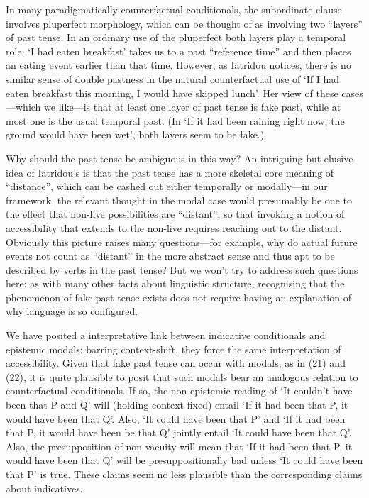 In many paradigmatically counterfactual conditionals, the subordinate
clause involves pluperfect morphology, which can be thought of as
involving two ``layers'' of past tense. In an ordinary use of the
pluperfect both layers play a temporal role: `I had eaten breakfast'
takes us to a past ``reference time'' and then places an eating event
earlier than that time. However, as Iatridou notices, there is no
similar sense of double pastness in the natural counterfactual use of
`If I had eaten breakfast this morning, I would have skipped lunch'. Her
view of these cases---which we like---is that at least one layer of past
tense is fake past, while at most one is the usual temporal past. (In
`If it had been raining right now, the ground would have been wet', both
layers seem to be fake.)

Why should the past tense be ambiguous in this way? An intriguing but
elusive idea of Iatridou's is that the past tense has a more skeletal
core meaning of ``distance'', which can be cashed out either temporally
or modally---in our framework, the relevant thought in the modal case
would presumably be one to the effect that non-live possibilities are
``distant'', so that invoking a notion of accessibility that extends to
the non-live requires reaching out to the distant. Obviously this
picture raises many questions---for example, why do actual future events
not count as ``distant'' in the more abstract sense and thus apt to be
described by verbs in the past tense? But we won't try to address such
questions here: as with many other facts about linguistic structure,
recognising that the phenomenon of fake past tense exists does not
require having an explanation of why language is so configured.

We have posited a interpretative link between indicative conditionals
and epistemic modals: barring context-shift, they force the same
interpretation of accessibility. Given that fake past tense can occur
with modals, as in (21) and (22), it is quite plausible to posit that
such modals bear an analogous relation to counterfactual conditionals.
If so, the non-epistemic reading of `It couldn't have been that P and Q'
will (holding context fixed) entail `If it had been that P, it would
have been that Q'. Also, `It could have been that P' and `If it had been
that P, it would have been be that Q' jointly entail `It could have been
that Q'. Also, the presupposition of non-vacuity will mean that `If it
had been that P, it would have been that Q' will be presuppositionally
bad unless `It could have been that P' is true. These claims seem no
less plausible than the corresponding claims about indicatives.

